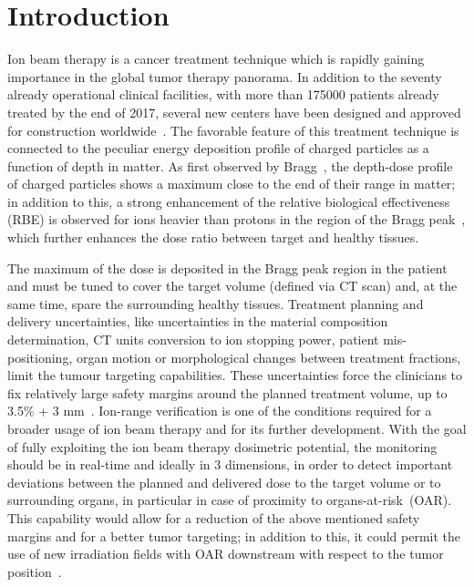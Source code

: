 \section{Introduction}\label{section::Intro}
Ion beam therapy is a cancer treatment technique which is rapidly gaining importance in the global tumor therapy panorama. In addition to the seventy already operational clinical facilities, with more than 175000 patients already treated by the end of 2017, several new centers have been designed and approved for construction worldwide~\cite{PTCOG_stats}. The favorable feature of this treatment technique is connected to the peculiar energy deposition profile of charged particles as a function of depth in matter. As first observed by Bragg~\cite{Bragg_main}, the depth-dose profile of charged particles shows a maximum close to the end of their range in matter; in addition to this, a strong enhancement of the relative biological effectiveness (RBE) is observed for ions heavier than protons in the region of the Bragg peak~\cite{RBE_Elsasser, RBE_Weyrather}, which further enhances the dose ratio between target and healthy tissues.

The maximum of the dose is deposited in the Bragg peak region in the patient and must be tuned to cover the target volume (defined via CT scan) and, at the same time, spare the surrounding healthy tissues. Treatment planning and delivery uncertainties, like uncertainties in the material composition determination, CT units conversion to ion stopping power, patient mis-positioning, organ motion or morphological changes between treatment fractions, limit the tumour targeting capabilities. These uncertainties force the clinicians to fix relatively large safety margins around the planned treatment volume, up to 3.5\% + 3 mm~\cite{Paganetti:2012aa}. Ion-range verification is one of the conditions required for a broader usage of ion beam therapy and for its further development. With the goal of fully exploiting the ion beam therapy dosimetric potential, the monitoring should be in real-time and ideally in 3 dimensions, in order to detect important deviations between the planned and delivered dose to the target volume or to surrounding organs, in particular in case of proximity to organs-at-risk~(OAR). This capability would allow for a reduction of the above mentioned safety margins and for a better tumor targeting; in addition to this, it could permit the use of new irradiation fields with OAR downstream with respect to the tumor position~\cite{Knopf:2013aa}.   

